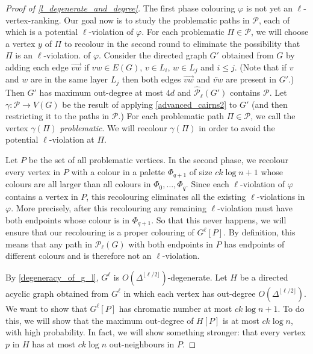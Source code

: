 \documentclass{patmorin}
\newcommand{\defin}[1]{\emph{\color{brightmaroon}#1}}
\newcommand{\pat}[1]{\textcolor{red}{PM:#1}}
\begin{document}
\begin{proof}[Proof of \cref{l_degenerate_and_degree}]
  The first phase colouring $\varphi$ is not yet an $\ell$-vertex-ranking.  Our goal now is to study the problematic paths in $\mathcal{P}$, each of which is a potential $\ell$-violation of $\varphi$.  For each problematic $\Pi\in\mathcal{P}$, we will choose a vertex $y$ of $\Pi$ to recolour in the second round to eliminate the possibility that $\Pi$ is an $\ell$-violation. of $\varphi$.  Consider the directed graph $G'$ obtained from $G$ by adding each edge $\overrightarrow{vw}$ if $vw\in E(G)$, $v\in L_i$, $w\in L_j$ and $i\le j$.  (Note that if $v$ and $w$ are in the same layer $L_j$ then both edges $\overrightarrow{vw}$ and $\overleftarrow{vw}$ are present in $G'$.)  Then $G'$ has maximum out-degree at most $4d$ and $\widehat{\mathcal{P}}_\ell(G')$ contains $\mathcal{P}$. Let $\gamma:\mathcal{P}\to V(G)$ be the result of applying \cref{advanced_cairns2} to $G'$ (and then restricting it to the paths in $\mathcal{P}$.)  For each problematic path $\Pi\in \mathcal{P}$, we call the vertex $\gamma(\Pi)$ \defin{problematic}.  We will recolour $\gamma(\Pi)$ in order to avoid the potential $\ell$-violation at $\Pi$.

  Let $P$ be the set of all problematic vertices.  In the second phase, we recolour every vertex in $P$ with a colour in a palette $\Phi_{q+1}$ of size $ck\log n + 1$ whose colours are all larger than all colours in $\Phi_0,\ldots,\Phi_q$.  Since each $\ell$-violation of $\varphi$ contains a vertex in $P$, this recolouring eliminates all the existing $\ell$-violations in $\varphi$.  More precisely, after this recolouring any remaining $\ell$-violation must have both endpoints whose colour is in $\Phi_{q+1}$.  So that this never happens, we will ensure that our recolouring is a proper colouring of $G^\ell[P]$.  By definition, this means that any path in $\mathcal{P}_\ell(G)$ with both endpoints in $P$ has endpoints of different colours and is therefore not an $\ell$-violation.

  By \cref{degeneracy_of_g_l}, $G^\ell$ is $O(\Delta^{\lfloor\ell /2\rfloor})$-degenerate.  Let $H$ be a directed acyclic graph obtained from $G^{\ell}$ in which each vertex has out-degree $O(\Delta^{\lfloor\ell /2\rfloor})$. We want to show that $G^\ell[P]$ has chromatic number at most $ck\log n+1$.
  To do this, we will show that the maximum out-degree of $H[P]$ is at most $ck\log n$, with high probability.  In fact, we will show something stronger: that every vertex $p$ in $H$ has at most $ck\log n$ out-neighbours in $P$.


\end{proof}
\end{document}
